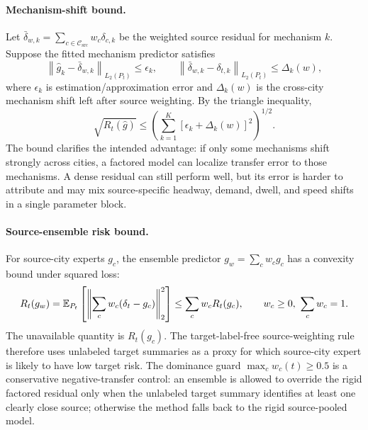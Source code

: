 \paragraph{Mechanism-shift bound.}
Let $\bar\delta_{w,k}=\sum_{c\in\mathcal{C}_{\mathrm{src}}} w_c \delta_{c,k}$ be the weighted source residual for mechanism $k$.
Suppose the fitted mechanism predictor satisfies
\[
    \left\|\hat g_k-\bar\delta_{w,k}\right\|_{L_2(P_t)}\le \epsilon_k,
    \qquad
    \left\|\bar\delta_{w,k}-\delta_{t,k}\right\|_{L_2(P_t)}\le \Delta_k(w),
\]
where $\epsilon_k$ is estimation/approximation error and $\Delta_k(w)$ is the cross-city mechanism shift left after source weighting.
By the triangle inequality,
\[
    \sqrt{R_t(\hat g)}
    \le
    \left(
        \sum_{k=1}^{K}
        \left[\epsilon_k+\Delta_k(w)\right]^2
    \right)^{1/2}.
\]
The bound clarifies the intended advantage: if only some mechanisms shift strongly across cities, a factored model can localize transfer error to those mechanisms.
A dense residual can still perform well, but its error is harder to attribute and may mix source-specific headway, demand, dwell, and speed shifts in a single parameter block.

\paragraph{Source-ensemble risk bound.}
For source-city experts $g_c$, the ensemble predictor $g_w=\sum_c w_c g_c$ has a convexity bound under squared loss:
\[
    R_t(g_w)
    =
    \mathbb{E}_{P_t}\left[
        \left\|
        \sum_c w_c(\delta_t-g_c)
        \right\|_2^2
    \right]
    \le
    \sum_c w_c R_t(g_c),
    \qquad
    w_c\ge0,\ \sum_c w_c=1.
\]
The unavailable quantity is $R_t(g_c)$.
The target-label-free source-weighting rule therefore uses unlabeled target summaries as a proxy for which source-city expert is likely to have low target risk.
The dominance guard $\max_c w_c(t)\ge0.5$ is a conservative negative-transfer control: an ensemble is allowed to override the rigid factored residual only when the unlabeled target summary identifies at least one clearly close source; otherwise the method falls back to the rigid source-pooled model.

